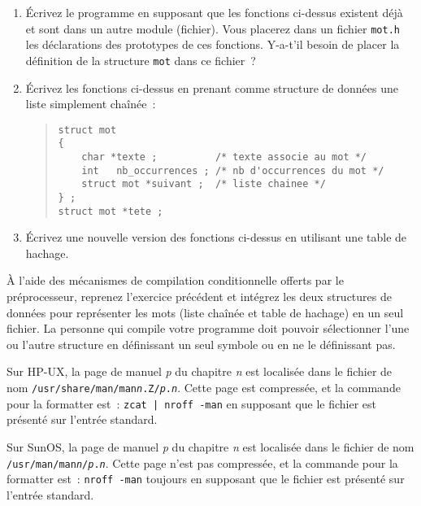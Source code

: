 \begin {enumerate}
    \item Écrivez le programme en supposant que les fonctions
	ci-dessus existent déjà et sont dans un autre module (fichier).
	Vous placerez dans un fichier {\tt mot.h} les déclarations des
	prototypes de ces fonctions.  Y-a-t'il besoin de placer la
	définition de la structure {\tt mot} dans ce fichier~?

    \item Écrivez les fonctions ci-dessus en prenant comme structure
	de données une liste simplement chaînée~:

\begin {quote}
\small
\begin {verbatim}
struct mot
{
    char *texte ;          /* texte associe au mot */
    int   nb_occurrences ; /* nb d'occurrences du mot */
    struct mot *suivant ;  /* liste chainee */
} ;
struct mot *tete ;
\end{verbatim}
\end {quote}

    \item Écrivez une nouvelle version des fonctions ci-dessus en
	utilisant une table de hachage.

\end {enumerate}


\question

\`A l'aide des mécanismes de compilation conditionnelle offerts par le
préprocesseur, reprenez l'exercice précédent et intégrez les deux
structures de données pour représenter les mots (liste chaînée et table
de hachage) en un seul fichier. La personne qui compile votre programme
doit pouvoir sélectionner l'une ou l'autre structure en définissant un
seul symbole ou en ne le définissant pas.


\question

Sur HP-UX, la page de manuel {\em p} du chapitre {\em n} est localisée
dans le fichier de nom
{\tt /usr/share/man/man{\em n}.Z/{\em p}.{\em n}}. Cette page est
compressée, et la commande pour la formatter est~:
\verb:zcat | nroff -man: en supposant que le fichier est présenté sur
l'entrée standard.

Sur SunOS, la page de manuel {\em p} du chapitre {\em n} est localisée
dans le fichier de nom
{\tt /usr/man/man{\em n}/{\em p}.{\em n}}. Cette page n'est pas
compressée, et la commande pour la formatter est~:
\verb:nroff -man: toujours en supposant que le fichier est présenté sur
l'entrée standard.

